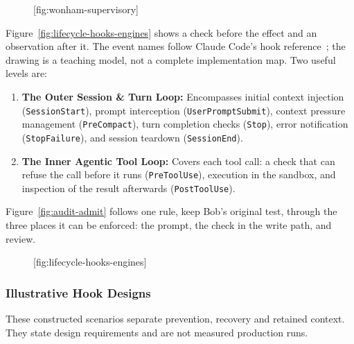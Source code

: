 \begin{figure}[tp]
  \centering
  [fig:wonham-supervisory]
\end{figure}

Figure~\ref{fig:lifecycle-hooks-engines} shows a check before the effect and
an observation after it. The event names follow Claude Code's hook
reference~; the drawing is a teaching model, not a
complete implementation map. Two useful levels are:
\begin{enumerate}[leftmargin=1.8em,itemsep=2pt]
  \item \textbf{The Outer Session \& Turn Loop:} Encompasses initial context injection (\texttt{SessionStart}), prompt interception (\texttt{UserPromptSubmit}), context pressure management (\texttt{PreCompact}), turn completion checks (\texttt{Stop}), error notification (\texttt{StopFailure}), and session teardown (\texttt{SessionEnd}).
  \item \textbf{The Inner Agentic Tool Loop:} Covers each tool call: a check that can refuse the call before it runs (\texttt{PreToolUse}), execution in the sandbox, and inspection of the result afterwards (\texttt{PostToolUse}).
\end{enumerate}

Figure~\ref{fig:audit-admit} follows one rule, keep Bob's original test,
through the three places it can be enforced: the prompt, the check in the
write path, and review.



\begin{figure}[tp]
  \centering
  [fig:lifecycle-hooks-engines]
\end{figure}

\subsubsection{Illustrative Hook Designs}
\label{sec:lifecycle-hook-cases}
These constructed scenarios separate prevention, recovery and retained
context. They state design requirements and are not measured production runs.

